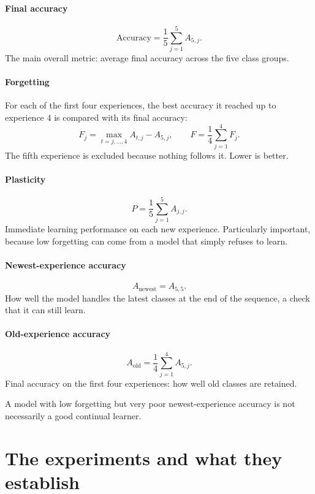 \documentclass[11pt,a4paper]{article}
\begin{document}
\subsection{Final accuracy}
\[
\text{Accuracy}=\frac15\sum_{j=1}^{5}A_{5,j}.
\]
The main overall metric: average final accuracy across the five class groups.

\subsection{Forgetting}
For each of the first four experiences, the best accuracy it reached up to experience 4 is compared with its final accuracy:
\[
F_j=\max_{t=j,\ldots,4}A_{t,j}-A_{5,j},
\qquad
\boxed{F=\frac14\sum_{j=1}^{4}F_j}.
\]
The fifth experience is excluded because nothing follows it. Lower is better.

\subsection{Plasticity}
\[
\boxed{P=\frac15\sum_{j=1}^{5}A_{j,j}}.
\]
Immediate learning performance on each new experience. Particularly important, because low forgetting can come from a model that simply refuses to learn.

\subsection{Newest-experience accuracy}
\[
\boxed{A_{\text{newest}}=A_{5,5}}.
\]
How well the model handles the latest classes at the end of the sequence, a check that it can still learn.

\subsection{Old-experience accuracy}
\[
\boxed{A_{\text{old}}=\frac14\sum_{j=1}^{4}A_{5,j}}.
\]
Final accuracy on the first four experiences: how well old classes are retained.

\begin{keybox}[title={Read the metrics together}]
A model with low forgetting but very poor newest-experience accuracy is not necessarily a good continual learner.
\end{keybox}

\part{The experiments and what they establish}
\end{document}
